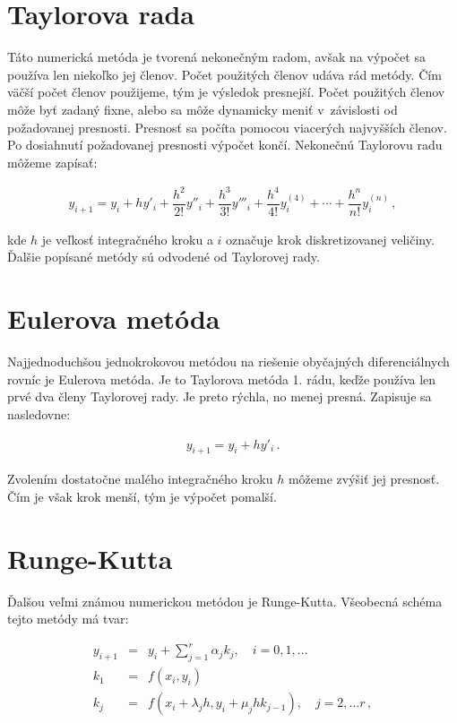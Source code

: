 \section{Taylorova rada}
Táto numerická metóda je tvorená nekonečným radom, avšak na výpočet sa používa len niekoľko jej členov. Počet použitých členov udáva rád metódy. Čím väčší počet členov použijeme, tým je výsledok presnejší. Počet použitých členov môže byť zadaný fixne, alebo sa môže dynamicky meniť v~závislosti od požadovanej presnosti. Presnosť sa počíta pomocou viacerých najvyšších členov. Po dosiahnutí požadovanej presnosti výpočet končí.
Nekonečnú Taylorovu radu môžeme zapísať:

\begin{eqnarray}
y_{i + 1} = y_{i} + h y'_{i} + \dfrac{h^{2}}{2!}y''_{i} + \dfrac{h^{3}}{3!}y'''_{i} + \dfrac{h^{4}}{4!}y^{(4)}_{i} + \cdots + \dfrac{h^{n}}{n!}y_{i}^{(n)} \, , \label{Taylor}
\end{eqnarray}

kde $ h $ je veľkosť integračného kroku a $ i $ označuje krok diskretizovanej veličiny. Ďalšie popísané metódy sú odvodené od Taylorovej rady.


\section{Eulerova metóda}
Najjednoduchšou jednokrokovou metódou na riešenie obyčajných diferenciálnych rovníc je Eulerova metóda. Je to Taylorova metóda 1. rádu, keďže používa len prvé dva členy Taylorovej rady. Je preto rýchla, no menej presná. Zapisuje sa nasledovne:

\begin{eqnarray}
y_{i+1} = y_{i} + hy'_{i} \, .
\end{eqnarray}

Zvolením dostatočne malého integračného kroku $ h $ môžeme zvýšiť jej presnosť. Čím je však krok menší, tým je výpočet pomalší.


\section{Runge-Kutta}
Ďalšou veľmi známou numerickou metódou je Runge-Kutta. Všeobecná schéma tejto metódy má tvar:

\begin{eqnarray}
y_{i+1} & = & y_{i} + \sum^{r}_{j=1} \alpha_{j}k_{j} , \quad i=0, 1,\dotsc \\
k_{1} & = & f(x_{i},y_{i}) \nonumber \\
k_{j} & = & f(x_{i} + \lambda_{j}h, y_{i} + \mu_{j}hk_{j-1}) , \quad j=2,\dotsc r \, , \nonumber
\end{eqnarray}


